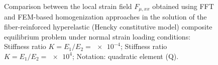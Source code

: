 \begin{figure}[hbt]
\begin{subfigure}[b]{\textwidth}
    \caption{}
    \label{subfig:svk_2D_ratio_-4_normal_strain_11}
  \end{subfigure}
  \caption{Comparison between the local strain field \(F_{\mu,xx}\) obtained using
  FFT and FEM-based homogenization approaches in the solution of the fiber-reinforced
  hyperelastic (Hencky constitutive model) composite equilibrium problem under normal strain loading conditions:
   Stiffness ratio \(K=E_1/E_2=\num{e-4}\);
   Stiffness ratio \(K=E_1/E_2=\num{e4}\);
  Notation: quadratic element (Q).}
\label{fig:svk_2D_stiff_contrast_normal_strain_11}
\end{figure}

\FloatBarrier

